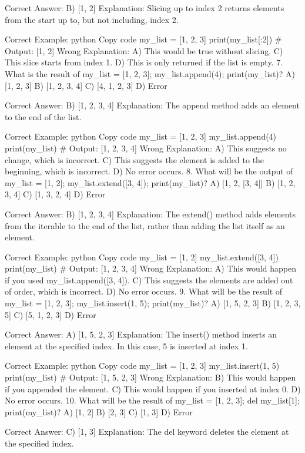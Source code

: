 Correct Answer: B) [1, 2]
Explanation: Slicing up to index 2 returns elements from the start up to, but not including, index 2.

Correct Example:
python
Copy code
my_list = [1, 2, 3]
print(my_list[:2])  # Output: [1, 2]
Wrong Explanation:
A) This would be true without slicing.
C) This slice starts from index 1.
D) This is only returned if the list is empty.
7. What is the result of my_list = [1, 2, 3]; my_list.append(4); print(my_list)?
A) [1, 2, 3]
B) [1, 2, 3, 4]
C) [4, 1, 2, 3]
D) Error

Correct Answer: B) [1, 2, 3, 4]
Explanation: The append method adds an element to the end of the list.

Correct Example:
python
Copy code
my_list = [1, 2, 3]
my_list.append(4)
print(my_list)  # Output: [1, 2, 3, 4]
Wrong Explanation:
A) This suggests no change, which is incorrect.
C) This suggests the element is added to the beginning, which is incorrect.
D) No error occurs.
8. What will be the output of my_list = [1, 2]; my_list.extend([3, 4]); print(my_list)?
A) [1, 2, [3, 4]]
B) [1, 2, 3, 4]
C) [1, 3, 2, 4]
D) Error

Correct Answer: B) [1, 2, 3, 4]
Explanation: The extend() method adds elements from the iterable to the end of the list, rather than adding the list itself as an element.

Correct Example:
python
Copy code
my_list = [1, 2]
my_list.extend([3, 4])
print(my_list)  # Output: [1, 2, 3, 4]
Wrong Explanation:
A) This would happen if you used my_list.append([3, 4]).
C) This suggests the elements are added out of order, which is incorrect.
D) No error occurs.
9. What will be the result of my_list = [1, 2, 3]; my_list.insert(1, 5); print(my_list)?
A) [1, 5, 2, 3]
B) [1, 2, 3, 5]
C) [5, 1, 2, 3]
D) Error

Correct Answer: A) [1, 5, 2, 3]
Explanation: The insert() method inserts an element at the specified index. In this case, 5 is inserted at index 1.

Correct Example:
python
Copy code
my_list = [1, 2, 3]
my_list.insert(1, 5)
print(my_list)  # Output: [1, 5, 2, 3]
Wrong Explanation:
B) This would happen if you appended the element.
C) This would happen if you inserted at index 0.
D) No error occurs.
10. What will be the result of my_list = [1, 2, 3]; del my_list[1]; print(my_list)?
A) [1, 2]
B) [2, 3]
C) [1, 3]
D) Error

Correct Answer: C) [1, 3]
Explanation: The del keyword deletes the element at the specified index.

